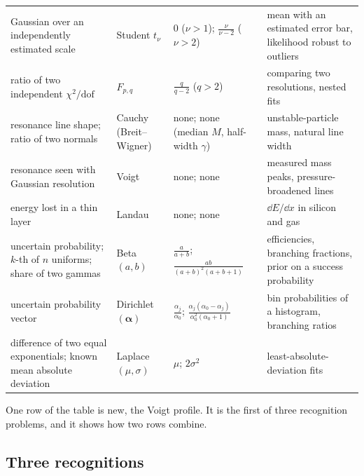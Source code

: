 \begin{taxonomy}
\begin{tabularx}{\linewidth}{@{}>{\raggedright\arraybackslash}p{3.55cm}>{\raggedright\arraybackslash}p{2.05cm}>{\raggedright\arraybackslash}p{3.0cm}>{\raggedright\arraybackslash}X@{}}
Gaussian over an independently estimated scale & Student $t_\nu$ & $0$ ($\nu>1$); $\frac{\nu}{\nu-2}$ ($\nu>2$) & mean with an estimated error bar, likelihood robust to outliers\\
ratio of two independent $\chi^2/\text{dof}$ & $F_{p,q}$ & $\frac{q}{q-2}$ ($q>2$) & comparing two resolutions, nested fits\\
resonance line shape; ratio of two normals & Cauchy (Breit--Wigner) & none; none (median $M$, half-width $\gamma$) & unstable-particle mass, natural line width\\
resonance seen with Gaussian resolution & Voigt & none; none & measured mass peaks, pressure-broadened lines\\
energy lost in a thin layer & Landau & none; none & $\dd E/\dd x$ in silicon and gas\\
uncertain probability; $k$-th of $n$ uniforms; share of two gammas & Beta$(a,b)$ & $\frac{a}{a+b}$; $\frac{ab}{(a+b)^2(a+b+1)}$ & efficiencies, branching fractions, prior on a success probability\\
uncertain probability vector & Dirichlet$(\bm\alpha)$ & $\frac{\alpha_j}{\alpha_0}$; $\frac{\alpha_j(\alpha_0-\alpha_j)}{\alpha_0^2(\alpha_0+1)}$ & bin probabilities of a histogram, branching ratios\\
difference of two equal exponentials; known mean absolute deviation & Laplace$(\mu,\sigma)$ & $\mu$; $2\sigma^2$ & least-absolute-deviation fits\\
\end{tabularx}
\end{taxonomy}

One row of the table is new, the Voigt profile. It is the first of three recognition problems, and it shows how two rows combine.

\subsection{Three recognitions}
\label{2b:sec:which-examples}

